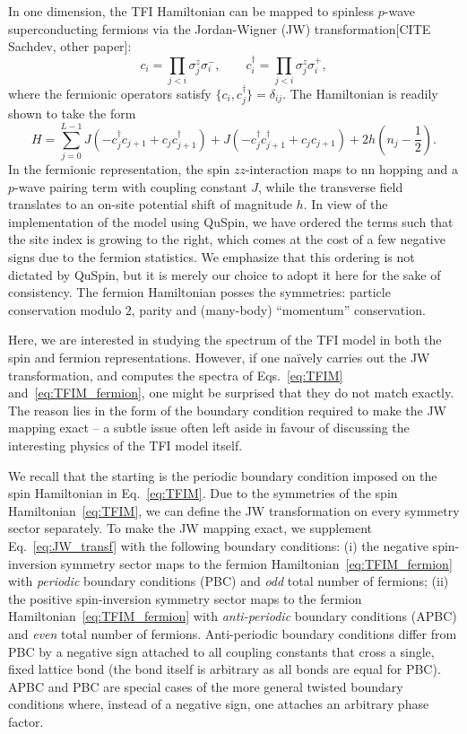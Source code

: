 \documentclass{SciPost}
\newcommand\0{\scalebox{-1}[1]{0}}
\begin{document}
In one dimension, the TFI Hamiltonian can be mapped to spinless $p$-wave superconducting fermions via the Jordan-Wigner (JW) transformation[CITE Sachdev, other paper]:
\begin{equation}
c_i=\prod_{j<i}\sigma^z_j\sigma^-_i,\qquad c^\dagger_i=\prod_{j<i}\sigma^z_j\sigma^+_i,
\label{eq:JW_transf}
\end{equation} 
where the fermionic operators satisfy $\{c_i,c^\dagger_j\}=\delta_{ij}$. The Hamiltonian is readily shown to take the form
\begin{equation}
H=\sum_{j=0}^{L-1}J\left(-c^\dagger_jc_{j+1} + c_jc^\dagger_{j+1} \right) +J\left( -c^\dagger_jc^\dagger_{j+1} + c_jc_{j+1}\right) + 2h\left(n_j-\frac{1}{2}\right).
\label{eq:TFIM_fermion}
\end{equation}
In the fermionic representation, the spin $zz$-interaction maps to nn hopping and a $p$-wave pairing term with coupling constant $J$, while the transverse field translates to an on-site potential shift of magnitude $h$. In view of the implementation of the model using QuSpin, we have ordered the terms such that the site index is growing to the right, which comes at the cost of a few negative signs due to the fermion statistics. We emphasize that this ordering is not dictated by QuSpin, but it is merely our choice to adopt it here for the sake of consistency. The fermion Hamiltonian posses the symmetries: particle conservation modulo $2$, parity and (many-body) ``momentum'' conservation.

Here, we are interested in studying the spectrum of the TFI model in both the spin and fermion representations. However, if one na\"ively carries out the JW transformation, and computes the spectra of Eqs.~\eqref{eq:TFIM} and~\eqref{eq:TFIM_fermion}, one might be surprised that they do not match exactly. The reason lies in the form of the boundary condition required to make the JW mapping exact -- a subtle issue often left aside in favour of discussing the interesting physics of the TFI model itself. 

We recall that the starting is the periodic boundary condition imposed on the spin Hamiltonian in Eq.~\eqref{eq:TFIM}. Due to the symmetries of the spin Hamiltonian~\eqref{eq:TFIM}, we can define the JW transformation on every symmetry sector separately. To make the JW mapping exact, we supplement Eq.~\eqref{eq:JW_transf} with the following boundary conditions: (i) the negative spin-inversion symmetry sector maps to the fermion Hamiltonian~\eqref{eq:TFIM_fermion} with \emph{periodic} boundary conditions (PBC) and \emph{odd} total number of fermions; (ii) the positive spin-inversion symmetry sector maps to the fermion Hamiltonian~\eqref{eq:TFIM_fermion} with \emph{anti-periodic} boundary conditions (APBC) and \emph{even} total number of fermions. Anti-periodic boundary conditions differ from PBC by a negative sign attached to all coupling constants that cross a single, fixed lattice bond (the bond itself is arbitrary as all bonds are equal for PBC). APBC and PBC are special cases of the more general twisted boundary conditions where, instead of a negative sign, one attaches an arbitrary phase factor.
\end{document}
